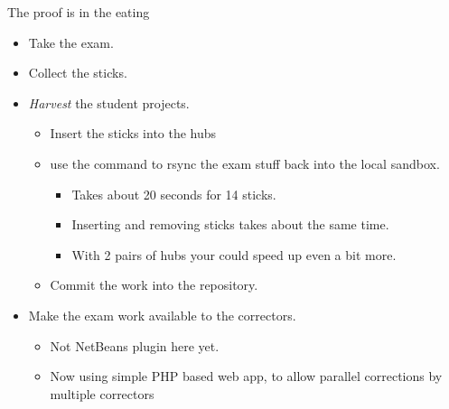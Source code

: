 \begin{frame}{The proof is in the eating}
  \begin{itemize}
  \item Take the exam.
  \item Collect the sticks.
  \item \textit{Harvest} the student projects.
    \begin{itemize}
    \item Insert the sticks into the hubs
    \item use the command  to rsync the exam stuff
      back into the local sandbox.
      \begin{itemize}
      \item Takes about 20 seconds for 14 sticks.\\
      \item Inserting and removing sticks takes about the same time.
    \item With 2 pairs of hubs your could speed up even a bit more.
    \end{itemize}
  \item Commit the work into the repository.
  \end{itemize}
  \item Make the exam work available to the correctors.
    \begin{itemize}
    \item Not NetBeans plugin here yet\InlineMwha.
    \item Now using simple PHP based web app, to allow parallel
      corrections by multiple correctors
    \end{itemize}

  \end{itemize}
\end{frame}

